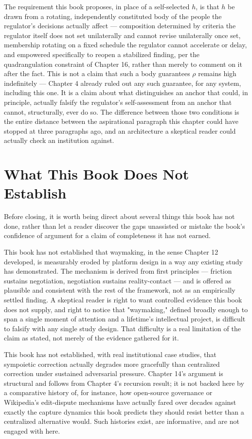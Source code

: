 \documentclass[12pt,a4paper]{book}
\begin{document}
The requirement this book proposes, in place of a self-selected $h$, is that $h$ be drawn from a rotating, independently constituted body of the people the regulator's decisions actually affect — composition determined by criteria the regulator itself does not set unilaterally and cannot revise unilaterally once set, membership rotating on a fixed schedule the regulator cannot accelerate or delay, and empowered specifically to reopen a stabilized finding, per the quadrangulation constraint of Chapter 16, rather than merely to comment on it after the fact. This is not a claim that such a body guarantees $\rho$ remains high indefinitely — Chapter 4 already ruled out any such guarantee, for any system, including this one. It is a claim about what distinguishes an anchor that could, in principle, actually falsify the regulator's self-assessment from an anchor that cannot, structurally, ever do so. The difference between those two conditions is the entire distance between the aspirational paragraph this chapter could have stopped at three paragraphs ago, and an architecture a skeptical reader could actually check an institution against.

\section{What This Book Does Not Establish}

Before closing, it is worth being direct about several things this book has not done, rather than let a reader discover the gaps unassisted or mistake the book's confidence of argument for a claim of completeness it has not earned.

This book has not established that waymaking, in the sense Chapter 12 developed, is measurably eroded by platform design in a way any existing study has demonstrated. The mechanism is derived from first principles — friction sustains negotiation, negotiation sustains reality-contact — and is offered as plausible and consistent with the rest of the framework, not as an empirically settled finding. A skeptical reader is right to want controlled evidence this book does not supply, and right to notice that "waymaking," defined broadly enough to span a single moment of attention and a lifetime's intellectual project, is difficult to falsify with any single study design. That difficulty is a real limitation of the claim as stated, not merely of the evidence gathered for it.

This book has not established, with real institutional case studies, that sympoietic correction actually degrades more gracefully than centralized correction under sustained adversarial pressure. Chapter 14's argument is structural and follows from Chapter 4's recursion result; it is not backed here by a comparative history of, for instance, how open-source governance or Wikipedia's edit-dispute mechanisms have actually fared over decades against exactly the capture dynamics this book predicts they should resist better than a centralized alternative would. Such histories exist, are informative, and are not engaged with here.
\end{document}
